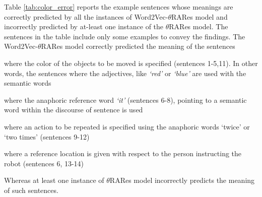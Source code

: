 Table \ref{tab:color_error} reports the example sentences whose meanings are correctly predicted by all the instances of Word2Vec-$\theta$RARes model and incorrectly predicted by at-least one instance of the $\theta$RARes model. The sentences in the table include only some examples to convey the findings. The Word2Vec-$\theta$RARes model correctly predicted the meaning of the sentences 
\begin{enumerate*}[(1)]

\item where the color of the objects to be moved is specified (sentences 1-5,11). In other words, the sentences where the adjectives, like \textit{`red'} or \textit{`blue'} are used with the semantic words

\item where the anaphoric reference word \textit{`it'} (sentences 6-8), pointing to a semantic word within the discourse of sentence is used

\item where an action to be repeated is specified using the anaphoric words `twice' or `two times' (sentences 9-12)

\item where a reference location is given with respect to the person instructing the robot (sentences 6, 13-14)
\end{enumerate*}
Whereas at least one instance of $\theta$RARes model incorrectly predicts the meaning of such sentences. 


